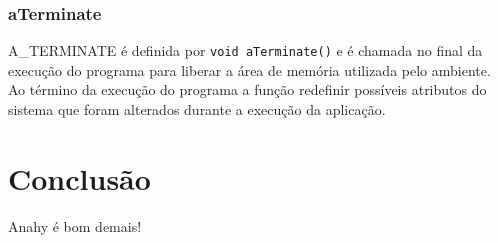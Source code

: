 \documentclass[12pt]{article} usepackage{sbc-template} usepackage{graphicx,url}
\begin{document}
\subsubsection*{aTerminate}

A\_TERMINATE é definida por \texttt{void aTerminate()} e é chamada no final da execução do programa para liberar a área de memória 
utilizada pelo ambiente. Ao término da execução do programa a função redefinir possíveis atributos do sistema que foram alterados 
durante a execução da aplicação.



\section{Conclusão} %
\label{sec:conclusao}

Anahy é bom demais!




\end{document}
